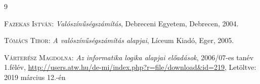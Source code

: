 \documentclass[colorlinks]{thesis-kando}
\theoremstyle{definition}
\theoremstyle{remark}
\begin{document}
	\clearpage
	
	\begin{thebibliography}{9}
		
		\textsc{Fazekas István}: \emph{Valószínűségszámítás}, Debreceni Egyetem, Debrecen, 2004.
		
		\textsc{Tómács Tibor}: \emph{A valószínűségszámítás alapjai}, Líceum Kiadó, Eger, 2005.
		
		\textsc{Várterész Magdolna}: \emph{Az informatika logika alapjai előadások}, 2006/07-es tanév 1.félév,
		\url{http://users.atw.hu/de-mi/index.php?r=file/download\&id=219}, Letöltve: 2019 március 12.-én
		
	\end{thebibliography}
	
\end{document}
